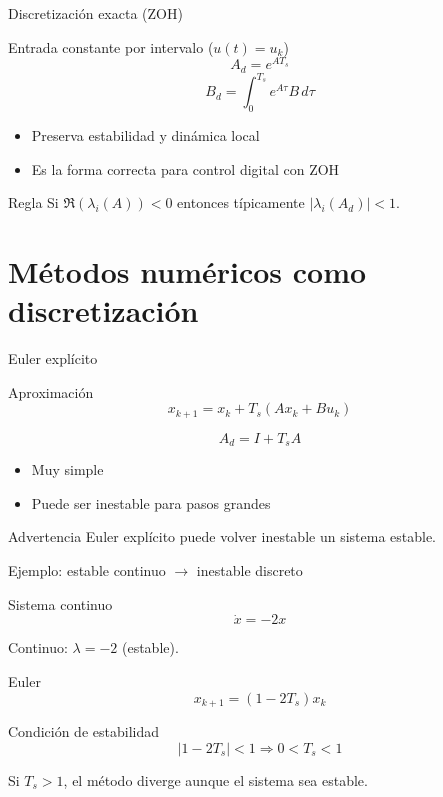 \documentclass[aspectratio=169,10pt]{beamer}
\newcommand{\importantbox}[2][Importante]{%
\begin{alertblock}{#1}#2\end{alertblock}}
\begin{document}
\begin{frame}{Discretización exacta (ZOH)}
\small
\begin{block}{Entrada constante por intervalo ($u(t)=u_k$)}
\[
A_d = e^{A T_s}
\]
\[
B_d = \int_0^{T_s} e^{A\tau} B\, d\tau
\]
\end{block}

\begin{itemize}
\item Preserva estabilidad y dinámica local
\item Es la forma correcta para control digital con ZOH
\end{itemize}

\importantbox[Regla]{
Si $\Re(\lambda_i(A))<0$ entonces típicamente $|\lambda_i(A_d)|<1$.
}
\end{frame}

\section{Métodos numéricos como discretización}

\begin{frame}{Euler explícito}
\small
\begin{block}{Aproximación}
\[
x_{k+1} = x_k + T_s (A x_k + B u_k)
\]
\end{block}

\[
A_d = I + T_s A
\]

\begin{itemize}
\item Muy simple
\item Puede ser inestable para pasos grandes
\end{itemize}

\importantbox[Advertencia]{
Euler explícito puede volver inestable un sistema estable.
}
\end{frame}

\begin{frame}{Ejemplo: estable continuo $\rightarrow$ inestable discreto}
\small

\begin{block}{Sistema continuo}
\[
\dot{x}=-2x
\]
\end{block}

Continuo: $\lambda=-2$ (estable).\\[1mm]

\begin{block}{Euler}
\[
x_{k+1}=(1-2T_s)x_k
\]
\end{block}

\importantbox[Condición de estabilidad]{
\[
|1-2T_s|<1 \Rightarrow 0<T_s<1
\]
}

Si $T_s>1$, el método diverge aunque el sistema sea estable.
\end{frame}
\end{document}

